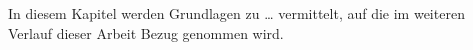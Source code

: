 In diesem Kapitel werden Grundlagen zu … vermittelt, auf die im weiteren Verlauf dieser Arbeit Bezug genommen wird.